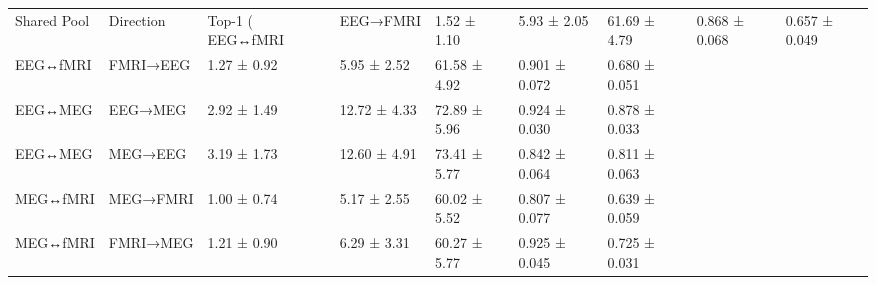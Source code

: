 \begin{tabular}{lllllll}
\toprule
Shared Pool & Direction & Top-1 (%
\midrule
EEG↔fMRI & EEG→FMRI & 1.52 ± 1.10 & 5.93 ± 2.05 & 61.69 ± 4.79 & 0.868 ± 0.068 & 0.657 ± 0.049 \\
EEG↔fMRI & FMRI→EEG & 1.27 ± 0.92 & 5.95 ± 2.52 & 61.58 ± 4.92 & 0.901 ± 0.072 & 0.680 ± 0.051 \\
EEG↔MEG & EEG→MEG & 2.92 ± 1.49 & 12.72 ± 4.33 & 72.89 ± 5.96 & 0.924 ± 0.030 & 0.878 ± 0.033 \\
EEG↔MEG & MEG→EEG & 3.19 ± 1.73 & 12.60 ± 4.91 & 73.41 ± 5.77 & 0.842 ± 0.064 & 0.811 ± 0.063 \\
MEG↔fMRI & MEG→FMRI & 1.00 ± 0.74 & 5.17 ± 2.55 & 60.02 ± 5.52 & 0.807 ± 0.077 & 0.639 ± 0.059 \\
MEG↔fMRI & FMRI→MEG & 1.21 ± 0.90 & 6.29 ± 3.31 & 60.27 ± 5.77 & 0.925 ± 0.045 & 0.725 ± 0.031 \\
\bottomrule
\end{tabular}
